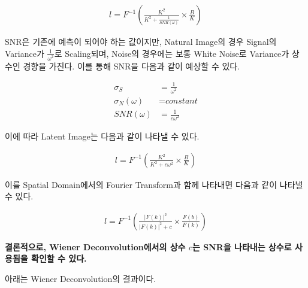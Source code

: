 \documentclass{report}
\begin{document}
\begin{align*}
    l=F^{-1}(\frac{K^2}{K^2+\frac{1}{SNR(\omega)}} \times \frac{B}{K})
\end{align*}

SNR은 기존에 예측이 되어야 하는 값이지만, Natural Image의 경우 Signal의 Variance가 $\frac{1}{\omega^2}$로 Scaling되며, Noise의 경우에는 보통 White Noise로 Variance가 상수인 경향을 가진다.
이를 통해 SNR을 다음과 같이 예상할 수 있다.

\begin{align*}
    \sigma_S &= \frac{1}{\omega^2} \\
    \sigma_N(\omega)&=\textit{constant} \\
    SNR(\omega)&=\frac{1}{c\omega^2}
\end{align*}

이에 따라 Latent Image는 다음과 같이 나타낼 수 있다.

\begin{align*}
    l=F^{-1}(\frac{K^2}{K^2+c\omega^2} \times \frac{B}{K})
\end{align*}

이를 Spatial Domain에서의 Fourier Transform과 함께 나타내면 다음과 같이 나타낼 수 있다.

\begin{align*}
    l=F^{-1}(\frac{|F(k)|^2}{|F(k)|^2+c} \times \frac{F(b)}{F(k)})
\end{align*}

\textbf{결론적으로, Wiener Deconvolution에서의 상수 $c$는 SNR을 나타내는 상수로 사용됨을 확인할 수 있다.}

아래는 Wiener Deconvolution의 결과이다.
\end{document}
